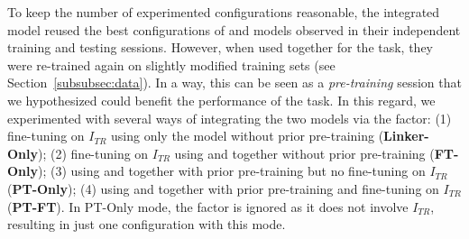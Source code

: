 To keep the number of experimented configurations reasonable, the integrated model reused the best configurations of \finder and \linker models observed in their independent training and testing sessions.
However, when used together for the \matching task, they were re-trained again on slightly modified training sets (see Section~\ref{subsubsec:data}).
In a way, this can be seen as a \textit{pre-training} session that we hypothesized could benefit the performance of the \matching task.
In this regard, we experimented with several ways of integrating the two models via the \glbMode factor:
(1) fine-tuning on $I_{TR}$ using only the \linker model without prior pre-training (\textbf{Linker-Only});
(2) fine-tuning on $I_{TR}$ using \finder and \linker together without prior pre-training (\textbf{FT-Only});
(3) using \finder and \linker together with prior pre-training but no fine-tuning on $I_{TR}$ (\textbf{PT-Only});
(4) using \finder and \linker together with prior pre-training and fine-tuning on $I_{TR}$ (\textbf{PT-FT}).
In PT-Only mode, the factor \glbAug is ignored as it does not involve $I_{TR}$, resulting in just one configuration with this mode.

